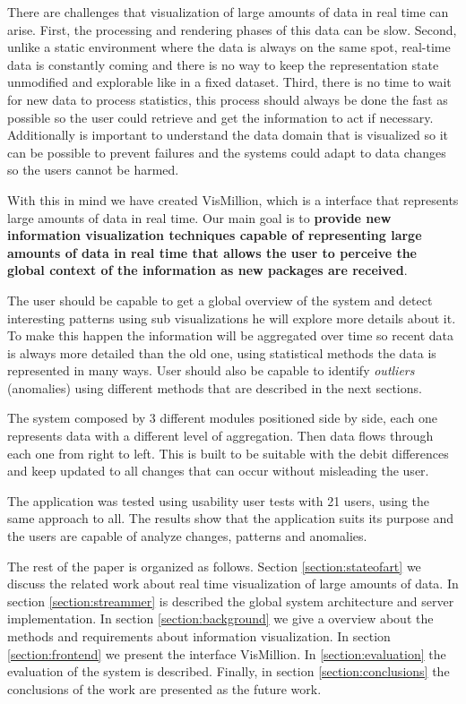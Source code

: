\documentclass[letterpaper, 10 pt, conference]{ieeeconf}  %
\begin{document}
There are challenges that visualization of large amounts of data in real time can arise. First, the processing and rendering phases of this data can be slow. Second, unlike a static environment where the data is always on the same spot, real-time data is constantly coming and there is no way to keep the representation state unmodified and explorable like in a fixed dataset. Third, there is no time to wait for new data to process statistics, this process should always be done the fast as possible so the user could retrieve and get the information to act if necessary. Additionally is important to understand the data domain that is visualized so it can be possible to prevent failures and the systems could adapt to data changes so the users cannot be harmed. 

With this in mind we have created VisMillion, which is a interface that represents large amounts of data in real time. Our main goal is to \textbf{provide new information visualization techniques capable of representing large amounts of data in real time that allows the user to perceive the global context of the information as new packages are received}.

The user should be capable to get a global overview of the system and detect interesting patterns using sub visualizations he will explore more details about it. To make this happen the information will be aggregated over time so recent data is always more detailed than the old one, using statistical methods the data is represented in many ways. User should also be capable to identify \textit{outliers} (anomalies) using different methods that are described in the next sections.

The system composed by 3 different modules positioned side by side, each one represents data with a different level of aggregation. Then data flows through each one from right to left. This is built to be suitable with the debit differences and keep updated to all changes that can occur without misleading the user. 

The application was tested using usability user tests with 21 users, using the same approach to all. The results show that the application suits its purpose and the users are capable of analyze changes, patterns and anomalies.

The rest of the paper is organized as follows. Section \ref{section:stateofart} we discuss the related work about real time visualization of large amounts of data. In section \ref{section:streammer} is described the global system architecture and server implementation. In section \ref{section:background} we give a overview about the methods and requirements about information visualization. In section \ref{section:frontend} we present the interface VisMillion. In \ref{section:evaluation} the evaluation of the system is described. Finally, in section \ref{section:conclusions} the conclusions of the work are presented as the future work.
\end{document}
